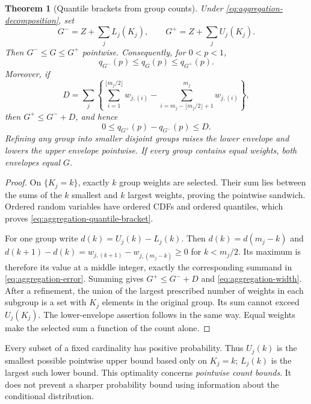 \documentclass[11pt,letterpaper]{article}
\numberwithin{equation}{section}
\newtheorem{theorem}{Theorem}[section]
\theoremstyle{definition}
\theoremstyle{remark}
\begin{document}
\begin{minipage}{\linewidth}
\begin{theorem}[Quantile brackets from group counts]
\label{thm:aggregation-bracket}
Under \eqref{eq:aggregation-decomposition}, set
\[
 G^-=Z+\sum_j L_j(K_j),\qquad G^+=Z+\sum_j U_j(K_j).
\]
Then $G^-\le G\le G^+$ pointwise. Consequently, for $0<p<1$,
\begin{equation}
 q_{G^-}(p)\le q_G(p)\le q_{G^+}(p).
 \label{eq:aggregation-quantile-bracket}
\end{equation}
Moreover, if
\begin{equation}
 D=\sum_j\left\{
   \sum_{i=1}^{\lfloor m_j/2\rfloor}w_{j,(i)}
   -\sum_{i=m_j-\lfloor m_j/2\rfloor+1}^{m_j}w_{j,(i)}
   \right\},
 \label{eq:aggregation-error}
\end{equation}
then $G^+\le G^-+D$, and hence
\begin{equation}
 0\le q_{G^+}(p)-q_{G^-}(p)\le D.
 \label{eq:aggregation-width}
\end{equation}
Refining any group into smaller disjoint groups raises the lower envelope
and lowers the upper envelope pointwise. If every group contains equal
weights, both envelopes equal $G$.
\end{theorem}
\end{minipage}


\begin{proof}
On $\{K_j=k\}$, exactly $k$ group weights are selected. Their sum lies
between the sums of the $k$ smallest and $k$ largest weights, proving the
pointwise sandwich. Ordered random variables have ordered CDFs and ordered
quantiles, which proves \eqref{eq:aggregation-quantile-bracket}.

For one group write $d(k)=U_j(k)-L_j(k)$. Then
$d(k)=d(m_j-k)$ and
$d(k+1)-d(k)=w_{j,(k+1)}-w_{j,(m_j-k)}\ge0$ for $k<m_j/2$.
Its maximum is therefore its value at a middle integer, exactly the
corresponding summand in \eqref{eq:aggregation-error}. Summing gives
$G^+\le G^-+D$ and \eqref{eq:aggregation-width}. After a refinement,
the union of the largest prescribed number of weights in each subgroup
is a set with $K_j$ elements in the original group. Its sum cannot exceed
$U_j(K_j)$. The lower-envelope assertion follows in the same way.
Equal weights make the selected sum a function of the count alone.
\end{proof}

Every subset of a fixed cardinality has positive probability. Thus $U_j(k)$
is the smallest possible pointwise upper bound based only on $K_j=k$;
$L_j(k)$ is the largest such lower bound. This optimality concerns
\emph{pointwise count bounds}. It does not prevent a sharper probability
bound using information about the conditional distribution.
\end{document}
